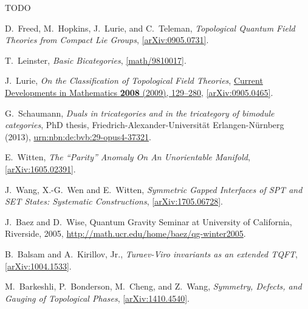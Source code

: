 \documentclass[12pt]{scrartcl}
\newcommand\arxiv[2]      {\href{http://arXiv.org/abs/#1}{#2}}
\theoremstyle{definition}
\numberwithin{equation}{section}
\numberwithin{definition}{section}
\numberwithin{figure}{section}
\begin{document}
TODO






\begin{thebibliography}{BDSPV}

D.~Freed, M.~Hopkins, J.~Lurie, and C.~Teleman,
\textsl{Topological Quantum Field Theories from Compact Lie Groups}, 
\href{http://arxiv.org/abs/0905.0731}{[\mbox{arXiv:}0905.0731]}. 

T.~Leinster, 
\textsl{Basic Bicategories}, 
\href{http://arxiv.org/abs/math/9810017}{[math/9810017]}.

J.~Lurie, 
\textsl{On the Classification of Topological Field Theories},
\href{https://projecteuclid.org/euclid.cdm/1254748657}{Current Developments in Mathematics \textbf{2008} (2009), 129--280}, 
\arxiv{0905.0465}{[arXiv:0905.0465]}.

G.~Schaumann, 
\textsl{Duals in tricategories and in the tricategory of bimodule categories}, 
PhD thesis, 
Friedrich-Alexander-Universit\"at Erlangen-N\"urnberg (2013), 
\href{http://nbn-resolving.de/urn/resolver.pl?urn:nbn:de:bvb:29-opus4-37321}{urn:nbn:de:bvb:29-opus4-37321}.

E.~Witten, 
\textsl{The ``Parity'' Anomaly On An Unorientable Manifold}, 
\href{http://arxiv.org/abs/1605.02391}{[arXiv:1605.02391]}.  

J.~Wang, X.-G.~Wen and E.~Witten, 
\textsl{Symmetric Gapped Interfaces of SPT and SET States: Systematic Constructions}, 
\href{http://arxiv.org/abs/1705.06728}{[arXiv:1705.06728]}.  





J.~Baez and D.~Wise, 
Quantum Gravity Seminar at University of California, Riverside, 2005, 
\url{http://math.ucr.edu/home/baez/qg-winter2005}.

B.~Balsam and A.~Kirillov, Jr., 
\textsl{Turaev-Viro invariants as an extended TQFT}, 
\href{http://www.arxiv.org/abs/1004.1533}{[arXiv:1004.1533]}.

M.~Barkeshli, P.~Bonderson, M.~Cheng, and Z.~Wang, 
\textsl{Symmetry, Defects, and Gauging of Topological Phases}, 
\href{http://www.arxiv.org/abs/1410.4540}{[arXiv:1410.4540]}.


\end{thebibliography}
\end{document}
